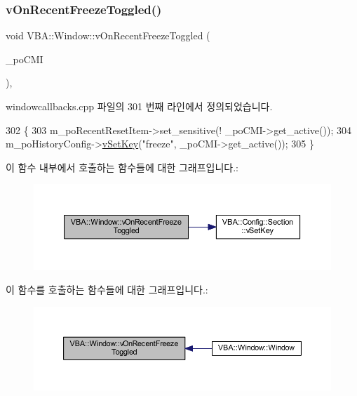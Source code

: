 \subsubsection{\texorpdfstring{v\+On\+Recent\+Freeze\+Toggled()}{vOnRecentFreezeToggled()}}
{\footnotesize\ttfamily void V\+B\+A\+::\+Window\+::v\+On\+Recent\+Freeze\+Toggled (\begin{DoxyParamCaption}\item[{Gtk\+::\+Check\+Menu\+Item $\ast$}]{\+\_\+po\+C\+MI }\end{DoxyParamCaption})\hspace{0.3cm}{\ttfamily [protected]}, {\ttfamily [virtual]}}



windowcallbacks.\+cpp 파일의 301 번째 라인에서 정의되었습니다.


\begin{DoxyCode}
302 \{
303   m\_poRecentResetItem->set\_sensitive(! \_poCMI->get\_active());
304   m\_poHistoryConfig->\mbox{\hyperlink{class_v_b_a_1_1_config_1_1_section_a57e1b95cbea40db71c093381beff4b0e}{vSetKey}}(\textcolor{stringliteral}{"freeze"}, \_poCMI->get\_active());
305 \}
\end{DoxyCode}
이 함수 내부에서 호출하는 함수들에 대한 그래프입니다.\+:
\nopagebreak
\begin{figure}[H]
\begin{center}
\leavevmode
\includegraphics[width=350pt]{class_v_b_a_1_1_window_aed773f053d4ab731d5a555dc940c0195_cgraph}
\end{center}
\end{figure}
이 함수를 호출하는 함수들에 대한 그래프입니다.\+:
\nopagebreak
\begin{figure}[H]
\begin{center}
\leavevmode
\includegraphics[width=350pt]{class_v_b_a_1_1_window_aed773f053d4ab731d5a555dc940c0195_icgraph}
\end{center}
\end{figure}
\mbox{\label{class_v_b_a_1_1_window_a8f8de1653cccaa5c61312c68f4a037fe}} 

